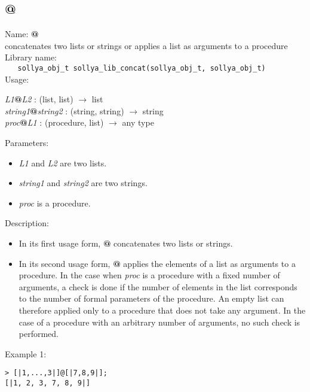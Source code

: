 \subsection{@}
\label{labconcat}
\noindent Name: \textbf{@}\\
\phantom{aaa}concatenates two lists or strings or applies a list as arguments to a procedure\\[0.2cm]
\noindent Library name:\\
\verb|   sollya_obj_t sollya_lib_concat(sollya_obj_t, sollya_obj_t)|\\[0.2cm]
\noindent Usage: 
\begin{center}
\emph{L1}\textbf{@}\emph{L2} : (\textsf{list}, \textsf{list}) $\rightarrow$ \textsf{list}\\
\emph{string1}\textbf{@}\emph{string2} : (\textsf{string}, \textsf{string}) $\rightarrow$ \textsf{string}\\
\emph{proc}\textbf{@}\emph{L1} : (\textsf{procedure}, \textsf{list}) $\rightarrow$ \textsf{any type}\\
\end{center}
Parameters: 
\begin{itemize}
\item \emph{L1} and \emph{L2} are two lists.
\item \emph{string1} and \emph{string2} are two strings.
\item \emph{proc} is a procedure.
\end{itemize}
\noindent Description: \begin{itemize}

\item In its first usage form, \textbf{@} concatenates two lists or strings.

\item In its second usage form, \textbf{@} applies the elements of a list as
   arguments to a procedure. In the case when \emph{proc} is a procedure 
   with a fixed number of arguments, a check is done if the number of
   elements in the list corresponds to the number of formal parameters
   of the procedure. An empty list can therefore applied only to a 
   procedure that does not take any argument. In the case of a 
   procedure with an arbitrary number of arguments, no such check is 
   performed.
\end{itemize}
\noindent Example 1: 
\begin{center}\begin{minipage}{15cm}\begin{Verbatim}[frame=single,commandchars=\\\|\~]
> [|1,...,3|]@[|7,8,9|];
[|1, 2, 3, 7, 8, 9|]
\end{Verbatim}
\end{minipage}\end{center}
